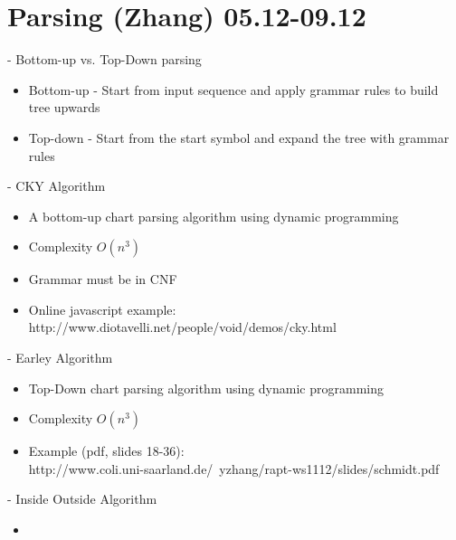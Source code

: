 \documentclass[11pt]{article}
\begin{document}
\section{Parsing (Zhang) 05.12-09.12}

- Bottom-up vs. Top-Down parsing
\begin{itemize}
 \item Bottom-up - Start from input sequence and apply grammar rules to build tree upwards
 \item Top-down - Start from the start symbol and expand the tree with grammar rules
\end{itemize}
- CKY Algorithm
\begin{itemize}
 \item A bottom-up chart parsing algorithm using dynamic programming
 \item Complexity $O(n^3)$ 
 \item Grammar must be in CNF
 \item Online javascript example: http://www.diotavelli.net/people/void/demos/cky.html
\end{itemize}
- Earley Algorithm
\begin{itemize}
 \item Top-Down chart parsing algorithm using dynamic programming
 \item Complexity $O(n^3)$
 \item Example (pdf, slides 18-36): \\http://www.coli.uni-saarland.de/~yzhang/rapt-ws1112/slides/schmidt.pdf
\end{itemize}
- Inside Outside Algorithm
\begin{itemize}
 \item 
\end{itemize}


%
%
%
%
%
%
\end{document}
